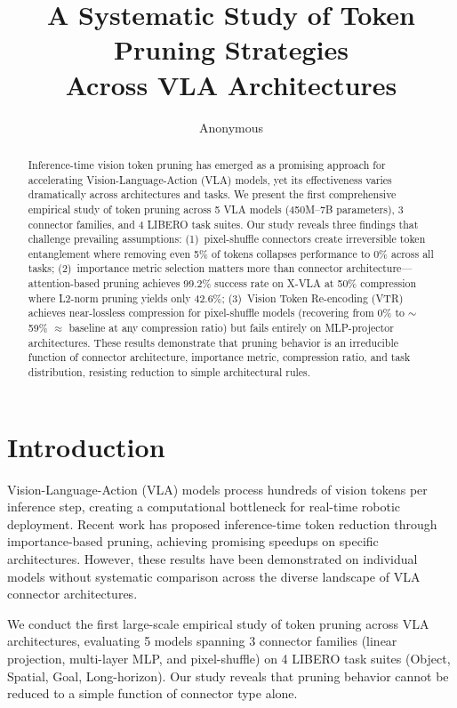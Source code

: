 \documentclass[letterpaper]{article}
\title{A Systematic Study of Token Pruning Strategies\\Across VLA Architectures}
\author{Anonymous}
\date{}
\begin{document}
\maketitle

\begin{abstract}
Inference-time vision token pruning has emerged as a promising approach for accelerating Vision-Language-Action (VLA) models, yet its effectiveness varies dramatically across architectures and tasks.
We present the first comprehensive empirical study of token pruning across 5 VLA models (450M--7B parameters), 3 connector families, and 4 LIBERO task suites.
Our study reveals three findings that challenge prevailing assumptions:
(1)~pixel-shuffle connectors create irreversible token entanglement where removing even 5\% of tokens collapses performance to 0\% across all tasks;
(2)~importance metric selection matters more than connector architecture---attention-based pruning achieves 99.2\% success rate on X-VLA at 50\% compression where L2-norm pruning yields only 42.6\%;
(3)~Vision Token Re-encoding (VTR) achieves near-lossless compression for pixel-shuffle models (recovering from 0\% to $\sim$59\% $\approx$ baseline at any compression ratio) but fails entirely on MLP-projector architectures.
These results demonstrate that pruning behavior is an irreducible function of connector architecture, importance metric, compression ratio, and task distribution, resisting reduction to simple architectural rules.
\end{abstract}

\section{Introduction}

Vision-Language-Action (VLA) models process hundreds of vision tokens per inference step, creating a computational bottleneck for real-time robotic deployment.
Recent work has proposed inference-time token reduction through importance-based pruning, achieving promising speedups on specific architectures.
However, these results have been demonstrated on individual models without systematic comparison across the diverse landscape of VLA connector architectures.

We conduct the first large-scale empirical study of token pruning across VLA architectures, evaluating 5 models spanning 3 connector families (linear projection, multi-layer MLP, and pixel-shuffle) on 4 LIBERO task suites (Object, Spatial, Goal, Long-horizon).
Our study reveals that pruning behavior cannot be reduced to a simple function of connector type alone.
\end{document}
